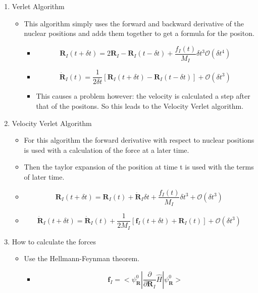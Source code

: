 \documentclass[11pt]{article}
\begin{document}
\begin{enumerate}
\item Verlet Algorithm
\label{sec-4-2-2-1}
\begin{itemize}
\item This algorithm simply uses the forward and backward derivative of the
nuclear positions and adds them together to get a formula for the
positon.
\begin{itemize}
\item \[ \mathbf{R}_{I}(t + \delta t) = 2\mathbf{R}_{I} -
         \mathbf{R}_{I}(t - \delta t) + \frac{f_I(t)}{M_{I}}\delta t^3 \mathcal{O}(\delta t^{4})  \]
\item \[ \mathbf{\dot{R}}_{I}(t) = \frac{1}{2 \delta t} [
         \mathbf{R}_{I}(t + \delta t) - \mathbf{R}_{I}(t - \delta t) ] + \mathcal{O}(\delta t^{3})  \]
\item This causes a problem however: the velocity is calculated a step
after that of the positons. So this leads to the Velocity Verlet
algorithm.
\end{itemize}
\end{itemize}

\item Velocity Verlet Algorithm
\label{sec-4-2-2-2}
\begin{itemize}
\item For this algorithm the forward derivative with respect to nuclear
positions is used with a calculation of the force at a later time.
\item Then the taylor expansion of the position at time t is used with the
terms of later time.
\item \[ \mathbf{R}_{I}(t + \delta t) = \mathbf{R}_{I}(t) +
       \mathbf{\dot{R}}_{I}\delta t + \frac{f_I(t)}{M_{I}}\delta t^3 + \mathcal{O}(\delta t^{3})  \]
\item \[ \mathbf{ \dot{R} }_{I}(t + \delta t) = \mathbf{\dot{R}}_{I}(t) +  \frac{1}{2 M_{I}} [ \mathbf{f}_{I}(t + \delta t) + \mathbf{R}_{I}(t)  ] + \mathcal{O}(\delta t^{3})  \]
\end{itemize}

\item How to calculate the forces
\label{sec-4-2-2-3}
\begin{itemize}
\item Use the Hellmann-Feynman theorem.
\begin{itemize}
\item $$ \mathbf{f}_{I} = < \psi^{0}_{\mathbf{R}} | \frac{\partial}{\partial   \mathbf{R}_{I}}\hat{H} |\psi^{0}_{\mathbf{R}} >   $$
\end{itemize}
\end{itemize}
\end{enumerate}
\end{document}
